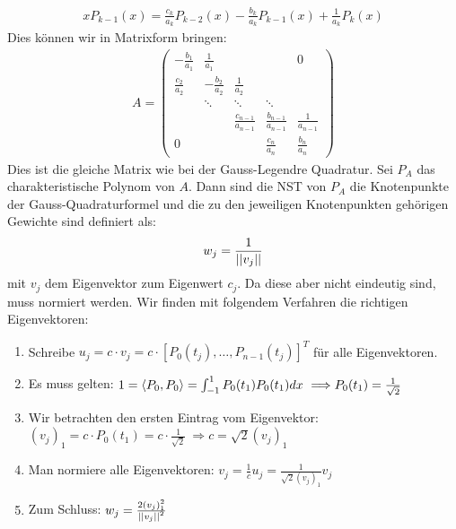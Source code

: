 \vspace{1\baselineskip}

\begin{align*}
    x P_{k-1} (x) = \frac{c_k}{a_k} P_{k-2} (x) - \frac{b_k}{a_k} P_{k-1} (x) + \frac{1}{a_k} P_{k} (x)
\end{align*}
Dies können wir in Matrixform bringen:
\begin{align*}
    A = \begin{pmatrix}
        - \frac{b_1}{a_1} & \frac{1}{a_1} & & & 0 \\
        \frac{c_2}{a_2} & - \frac{b_2}{a_2} & \frac{1}{a_2} & & \\
        & \ddots & \ddots & \ddots & \\
        & & \frac{c_{n-1}}{a_{n-1}} & \frac{b_{n-1}}{a_{n-1}} & \frac{1}{a_{n-1}} \\
        0 & & & \frac{c_n}{a_n} & \frac{b_n}{a_n}
    \end{pmatrix}
\end{align*}
Dies ist die gleiche Matrix wie bei der Gauss-Legendre Quadratur.
Sei $P_A$ das charakteristische Polynom von $A$. Dann sind die NST von $P_A$ die
Knotenpunkte der Gauss-Quadraturformel und die zu den jeweiligen Knotenpunkten
gehörigen Gewichte sind definiert als:
\begin{align*}
    w_j = \frac{1}{\left\vert\left\vert v_j \right\vert\right\vert}
\end{align*}
mit $v_j$ dem Eigenvektor zum Eigenwert $c_j$. Da diese aber nicht eindeutig sind,
muss normiert werden. Wir finden mit folgendem Verfahren die richtigen Eigenvektoren:
\begin{enumerate}
    \item Schreibe $u_j = c \cdot v_j = c \cdot [P_0 (t_j) , \dots , P_{n-1} (t_j)]^T$ für
            alle Eigenvektoren.
    \item Es muss gelten: $1=\left\langle P_0 , P_0 \right\rangle = \int_{-1}^1 P_0 (t_1) P_0 (t_1) dx \
            \Longrightarrow P_0 (t_1) = \frac{1}{\sqrt{2}}$
    \item Wir betrachten den ersten Eintrag vom Eigenvektor: $(v_j)_1 = c \cdot P_0 (t_1) =
            c \cdot \frac{1}{\sqrt{2}} \ \Longrightarrow c = \sqrt{2} (v_j)_1$
    \item Man normiere alle Eigenvektoren: $v_j = \frac{1}{c} u_j = \frac{1}{\sqrt{2} (v_j)_1}
            v_j$
    \item Zum Schluss: $w_j = \frac{2 (v_j)_1^2}{\left\vert\left\vert v_j \right\vert\right\vert^2}$
\end{enumerate}

